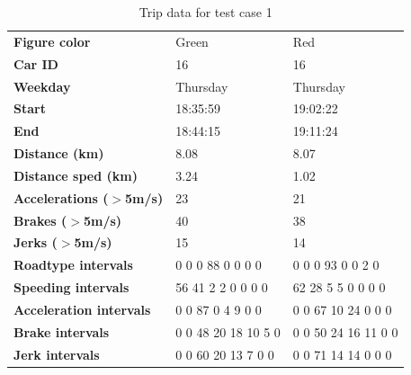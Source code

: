 \begin{table}
    \begin{tabular}{>{\bfseries}l|ll|}
    Figure color             & Green               & Red                 \\
    Car ID                   & 16                  & 16                  \\
    Weekday                  & Thursday            & Thursday            \\
    Start                    & 18:35:59            & 19:02:22            \\
    End                      & 18:44:15            & 19:11:24            \\
    Distance (km)            & 8.08                & 8.07                \\
    Distance sped (km)       & 3.24                & 1.02                \\
    Accelerations ($>$5m/s)  & 23                  & 21                  \\
    Brakes ($>$5m/s)         & 40                  & 38                  \\
    Jerks ($>$5m/s)          & 15                  & 14                  \\
    Roadtype intervals       & 0 0 0 88 0 0 0 0    & 0 0 0 93 0 0 2 0    \\
    Speeding intervals       & 56 41 2 2 0 0 0 0   & 62 28 5 5 0 0 0 0   \\
    Acceleration intervals   & 0 0 87 0 4 9 0 0    & 0 0 67 10 24 0 0 0  \\
    Brake intervals          & 0 0 48 20 18 10 5 0 & 0 0 50 24 16 11 0 0 \\
    Jerk intervals           & 0 0 60 20 13 7 0 0  & 0 0 71 14 14 0 0 0  \\
    \end{tabular}
    \caption{Trip data for test case 1}
    \label{tab:shorttrips}
\end{table}

